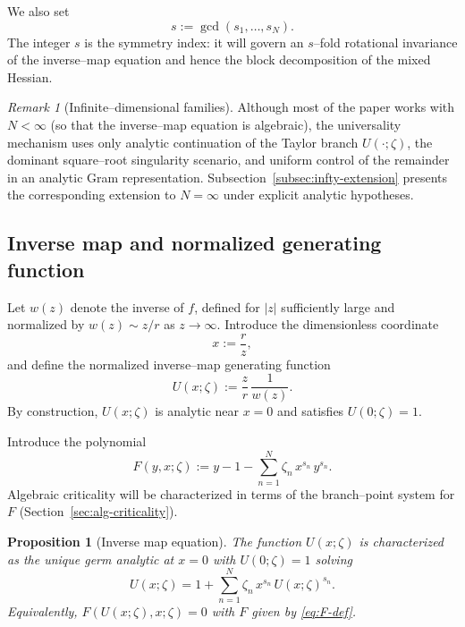 \documentclass[11pt]{amsart}
\numberwithin{equation}{section}
\theoremstyle{plain}
\newtheorem{proposition}[theorem]{Proposition}
\theoremstyle{definition}
\theoremstyle{remark}
\newtheorem{remark}[theorem]{Remark}
\begin{document}
We also set
\begin{equation}\label{eq:sdef}
	s:=\gcd(s_1,\dots,s_N).
\end{equation}
The integer $s$ is the symmetry index: it will govern an $s$--fold rotational invariance of the
inverse--map equation and hence the block decomposition of the mixed Hessian.

\begin{remark}[Infinite--dimensional families]\label{rem:infty-families}
	Although most of the paper works with $N<\infty$ (so that the inverse--map equation is algebraic),
	the universality mechanism uses only analytic continuation of the Taylor branch $U(\cdot;\zeta)$,
	the dominant square--root singularity scenario, and uniform control of the remainder in an analytic
	Gram representation. Subsection~\ref{subsec:infty-extension} presents the corresponding extension to
	$N=\infty$ under explicit analytic hypotheses.
\end{remark}

\subsection{Inverse map and normalized generating function}

Let $w(z)$ denote the inverse of $f$, defined for $|z|$ sufficiently large and normalized by
$w(z)\sim z/r$ as $z\to\infty$. Introduce the dimensionless coordinate
\[
	x:=\frac{r}{z},
\]
and define the normalized inverse--map generating function
\begin{equation}\label{eq:U-def}
	U(x;\zeta):=\frac{z}{r}\,\frac{1}{w(z)}.
\end{equation}
By construction, $U(x;\zeta)$ is analytic near $x=0$ and satisfies $U(0;\zeta)=1$.


Introduce the polynomial
\begin{equation}\label{eq:F-def}
	F(y,x;\zeta):=y-1-\sum_{n=1}^N \zeta_n\,x^{s_n}\,y^{s_n}.
\end{equation}
Algebraic criticality will be characterized in terms of the branch--point system for $F$
(Section~\ref{sec:alg-criticality}).

\begin{proposition}[Inverse map equation]\label{prop:inv-eq}
	The function $U(x;\zeta)$ is characterized as the unique germ analytic at $x=0$ with $U(0;\zeta)=1$
	solving
	\begin{equation}\label{eq:inv-eq}
		U(x;\zeta)=1+\sum_{n=1}^N \zeta_n\,x^{s_n}\,U(x;\zeta)^{s_n}.
	\end{equation}
	Equivalently, $F(U(x;\zeta),x;\zeta)=0$ with $F$ given by \eqref{eq:F-def}.
\end{proposition}
\end{document}
